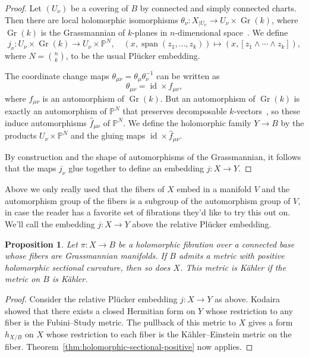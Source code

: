 \documentclass[10pt,a4paper]{amsart}
\newtheorem{prop}[theo]{Proposition}
\theoremstyle{definition}
\newcommand{\kk}[1]{\mathbb{#1}}
\DeclareMathOperator{\Span}{span}
\DeclareMathOperator{\Gr}{Gr}
\DeclareMathOperator{\id}{id}
\def\kahler{K\"ahler}
\def\kahlerEinstein{\kahler--Einstein}
\begin{document}
\begin{proof}
Let $(U_{\nu})$ be a covering of $B$ by connected and simply connected charts.
Then there are local holomorphic isomorphisms $\theta_{\nu} : X_{|U_{\nu}} \to U_{\nu} \times \Gr(k)$, where $\Gr(k)$ is the Grassmannian of $k$-planes in $n$-dimensional space~\cite{fischer1965lokal}.
We define
\[
  j_{\nu} : U_{\nu} \times \Gr(k) \to U_{\nu} \times \kk P^{N},
  \quad
  (x, \Span(z_{1}, \ldots, z_{k}))
  \mapsto
  (x, [z_{1} \wedge \cdots \wedge z_{k}]),
\]
where $N = \binom nk$,
to be the usual Pl\"ucker embedding.

The coordinate change maps $\theta_{\mu\nu} = \theta_{\mu}\theta_{\nu}^{-1}$ can be written as
\[
\theta_{\mu\nu} = \id \times f_{\mu\nu},
\]
where $f_{\mu\nu}$ is an automorphism of $\Gr(k)$.
But an automorphism of $\Gr(k)$ is exactly an automorphism of $\kk P^{N}$ that preserves decomposable $k$-vectors~\cite{cowen1989automorphisms}, so these induce automorphisms $\hat f_{\mu\nu}$ of $\kk P^{N}$. We define the holomorphic family $Y \to B$ by the products $U_{\nu} \times \kk P^{N}$ and the gluing maps $\id \times \hat f_{\mu\nu}$.

By construction and the shape of automorphisms of the Grassmannian, it follows that the maps $j_{\nu}$ glue together to define an embedding $j : X \to Y$.
\end{proof}

Above we only really used that the fibers of $X$ embed in a manifold $V$ and the automorphism group of the fibers is a subgroup of the automorphism group of $V$, in case the reader has a favorite set of fibrations they'd like to try this out on.
We'll call the embedding $j : X \to Y$ above the relative Pl\"ucker embedding.

\begin{prop}
Let $\pi : X \to B$ be a holomorphic fibration over a connected base whose fibers are Grassmannian manifolds.
If $B$ admits a metric with positive holomorphic sectional curvature, then so does $X$.
This metric is \kahler{} if the metric on $B$ is \kahler{}.
\end{prop}

\begin{proof}
Consider the relative Pl\"ucker embedding $j : X \to Y$ as above.
Kodaira~\cite[Section 4(V)]{kodaira-embedding} showed that there exists a closed Hermitian form on $Y$ whose restriction to any fiber is the Fubini--Study metric.
The pullback of this metric to $X$ gives a form $h_{X/B}$ on $X$ whose restriction to each fiber is the \kahlerEinstein{} metric on the fiber.
Theorem~\ref{thm:holomorphic-sectional-positive} now applies.
\end{proof}
\end{document}
